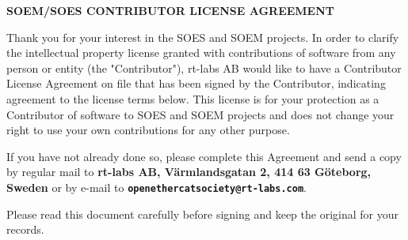 \documentclass[10pt,a4paper]{letter}
\begin{document}
\medskip

\begin{center}
   \Large{\textbf{SOEM/SOES CONTRIBUTOR LICENSE AGREEMENT}}
\end{center}

Thank you for your interest in the SOES and SOEM projects. In order to clarify
the intellectual property license granted with contributions of software from
any person or entity (the "Contributor"), rt-labs AB would like to have
a Contributor License Agreement on file that has been signed by the Contributor,
indicating agreement to the license terms below. This license is for your
protection as a Contributor of software to SOES and SOEM projects and does not
change your right to use your own contributions for any other purpose.

If you have not already done so, please complete this Agreement and send a copy
by regular mail to \textbf{rt-labs AB, Värmlandsgatan 2, 414 63 Göteborg,
   Sweden} or by e-mail to \textbf{\texttt{openethercatsociety@rt-labs.com}}.

Please read this document carefully before signing and keep the original for
your records.


\medskip
\end{document}
